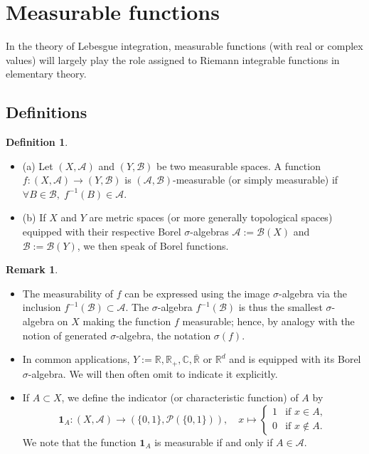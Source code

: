 \documentclass[11pt]{article}
\theoremstyle{definition}
\newtheorem{definition}{Definition}[section]
\newtheorem{remark}{Remark}[section]
\begin{document}
\newpage
\section{Measurable functions}
In the theory of Lebesgue integration, measurable functions (with real or complex values) will largely play the role assigned to Riemann integrable functions in elementary theory.
\subsection{Definitions}
\begin{definition}
\begin{itemize}
\item (a) Let $(X,\mathscr{A})$ and $(Y,\mathscr{B})$ be two measurable spaces. A function $f:(X,\mathscr{A}) \to (Y,\mathscr{B})$ is $(\mathscr{A},\mathscr{B})$-measurable (or simply measurable) if $\forall B \in \mathscr{B}, \; f^{-1}(B)\in\mathscr{A}$.

\item (b) If $X$ and $Y$ are metric spaces (or more generally topological spaces) equipped with their respective Borel $\sigma$-algebras $\mathscr{A}:=\mathscr{B}(X)$ and $\mathscr{B}:=\mathscr{B}(Y)$, we then speak of Borel functions.
\end{itemize}
\end{definition}

\begin{remark}
\begin{itemize}
    \item The measurability of $f$ can be expressed using the image $\sigma$-algebra via the inclusion $f^{-1}(\mathscr{B})\subset \mathscr{A}$. The $\sigma$-algebra $f^{-1}(\mathscr{B})$ is thus the smallest $\sigma$-algebra on $X$ making the function $f$ measurable; hence, by analogy with the notion of generated $\sigma$-algebra, the notation $\sigma(f)$.
    \item In common applications, $Y:=\mathbb{R}, \mathbb{R}_{+}, \mathbb{C}, \overline{\mathbb{R}}$ or $\mathbb{R}^d$ and is equipped with its Borel $\sigma$-algebra. We will then often omit to indicate it explicitly.
    \item If $A\subset X$, we define the indicator (or characteristic function) of $A$ by
    \[
    \mathbf{1}_A:(X,\mathscr{A}) \longrightarrow (\{0,1\},\mathscr{P}(\{0,1\})),
    \quad x\mapsto
    \begin{cases}
    1 &\text{if } x\in A, \\
    0 &\text{if } x\notin A.
    \end{cases}
    \]
    We note that the function $\mathbf{1}_A$ is measurable if and only if $A\in \mathscr{A}$.
\end{itemize}
\end{remark}
\end{document}
